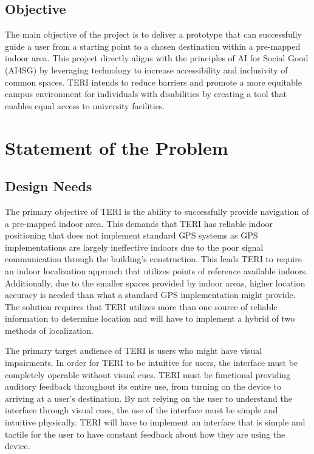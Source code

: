 \documentclass{article}
\begin{document}
\subsection{Objective}
The main objective of the project is to deliver a prototype that can successfully guide a user from a starting point to a chosen destination within a pre-mapped indoor area. This project directly aligns with the principles of AI for Social Good (AI4SG) by leveraging technology to increase accessibility and inclusivity of common spaces. TERI intends to reduce barriers and promote a more equitable campus environment for individuals with disabilities by creating a tool that enables equal access to university facilities.

\section{Statement of the Problem}

\subsection{Design Needs}
The primary objective of TERI is the ability to successfully provide navigation of a pre-mapped indoor area. This demands that TERI has reliable indoor positioning that does not implement standard GPS systems as GPS implementations are largely ineffective indoors due to the poor signal communication through the building's construction. This leads TERI to require an indoor localization approach that utilizes points of reference available indoors. Additionally, due to the smaller spaces provided by indoor areas, higher location accuracy is needed than what a standard GPS implementation might provide. The solution requires that TERI utilizes more than one source of reliable information to determine location and will have to implement a hybrid of two methods of localization.

The primary target audience of TERI is users who might have visual impairments. In order for TERI to be intuitive for users, the interface must be completely operable without visual cues. TERI must be functional providing auditory feedback throughout its entire use, from turning on the device to arriving at a user's destination. By not relying on the user to understand the interface through visual cues, the use of the interface must be simple and intuitive physically. TERI will have to implement an interface that is simple and tactile for the user to have constant feedback about how they are using the device.
\end{document}
